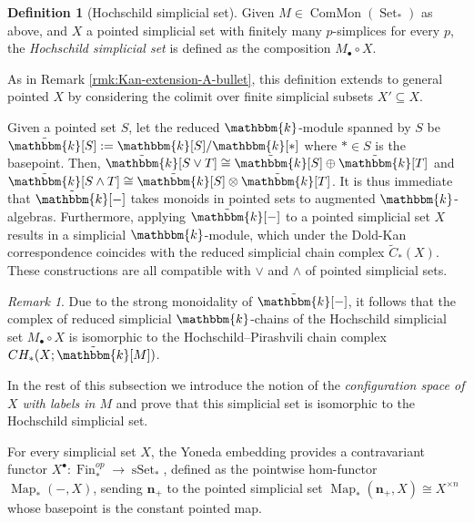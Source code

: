 \documentclass[12pt]{article}
\newcommand{\kk}{\mathbbm{k}}
\newcommand{\n}[1][n]{\mathbf{#1}}
\newcommand{\FinPointedSet}[1]{\n[#1]_{+}}
\DeclareMathOperator{\Fin}{Fin}
\DeclareMathOperator{\Set}{Set}
\theoremstyle{plain}
\theoremstyle{definition}
\newtheorem{defi}[thm]{Definition}
\theoremstyle{remark}
\newtheorem{rmk}[thm]{Remark}
\begin{document}
\begin{defi}[Hochschild simplicial set]\label{def:Loday-pointed-sets}
    Given $M\in \operatorname{ComMon}(\Set_{\ast})$ as above, and $X$ a pointed simplicial set with finitely many $p$-simplices for every $p$, the \emph{Hochschild simplicial set} is defined as the composition $M_{\bullet} \circ X$.
    
    As in Remark \ref{rmk:Kan-extension-A-bullet}, this definition extends to general pointed $X$ by considering the colimit over finite simplicial subsets $X'\subseteq X$.
\end{defi}

Given a pointed set $S$, let the reduced $\kk$-module spanned by $S$ be $\tilde{\kk}[S]:= \kk[S]/\kk[*]$ where $*\in S$ is the basepoint. Then, $\tilde{\kk}[S\vee T] \cong \tilde{\kk}[S]\oplus \tilde{\kk}[T]$ and $\tilde{\kk}[S\wedge T]\cong \tilde{\kk}[S]\otimes \tilde{\kk}[T]$. It is thus immediate that $\tilde{\kk}[-]$ takes monoids in pointed sets to augmented $\kk$-algebras. Furthermore, applying $\tilde{\kk}[-]$ to a pointed simplicial set $X$ results in a simplicial $\kk$-module, which under the Dold-Kan correspondence coincides with the reduced simplicial chain complex $\tilde{C}_*(X)$. These constructions are all compatible with $\vee$ and $\wedge$ of pointed simplicial sets.

\begin{rmk}\label{rmk:simplicial-set-Hochschild}
    Due to the strong monoidality of $\tilde{\kk}[-]$, it follows that the complex of reduced simplicial $\kk$-chains of the Hochschild simplicial set $M_{\bullet}\circ X$ is isomorphic to the Hochschild--Pirashvili chain complex $CH_*(X; \tilde{\kk}[M])$.
\end{rmk}

In the rest of this subsection we introduce the notion of the \emph{configuration space of $X$ with labels in $M$} and prove that this simplicial set is isomorphic to the Hochschild simplicial set. 

For every simplicial set $X$, the Yoneda embedding provides a contravariant functor $X^{\bullet}\colon \Fin_{\ast}^{op}\to \operatorname{sSet}_{\ast}$, defined as the pointwise hom-functor $\operatorname{Map}_{\ast}(-, X)$, sending $\FinPointedSet{n}$ to the pointed simplicial set $\operatorname{Map}_{\ast}(\FinPointedSet{n}, X)\cong X^{\times n}$ whose basepoint is the constant pointed map.
\end{document}

